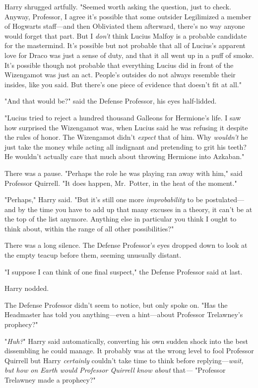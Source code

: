 Harry shrugged artfully. "Seemed worth asking the question, just to check. Anyway, Professor, I agree it's possible that some outsider Legilimized a member of Hogwarts staff---and then Obliviated them afterward, there's no way anyone would forget that part. But I \emph{don't} think Lucius Malfoy is a probable candidate for the mastermind. It's possible but not probable that all of Lucius's apparent love for Draco was just a sense of duty, and that it all went up in a puff of smoke. It's possible though not probable that everything Lucius did in front of the Wizengamot was just an act. People's outsides do not always resemble their insides, like you said. But there's one piece of evidence that doesn't fit at all."

"And that would be?" said the Defense Professor, his eyes half-lidded.

"Lucius tried to reject a hundred thousand Galleons for Hermione's life. I saw how surprised the Wizengamot was, when Lucius said he was refusing it despite the rules of honor. The Wizengamot didn't \emph{expect} that of him. Why \emph{wouldn't} he just take the money while acting all indignant and pretending to grit his teeth? He wouldn't actually care that much about throwing Hermione into Azkaban."

There was a pause. "Perhaps the role he was playing ran away with him," said Professor Quirrell. "It does happen, Mr.~Potter, in the heat of the moment."

"Perhaps," Harry said. "But it's still one more \emph{improbability} to be postulated---and by the time you have to add up that many excuses in a theory, it can't be at the top of the list anymore. Anything else in particular you think I ought to think about, within the range of all other possibilities?"

There was a long silence. The Defense Professor's eyes dropped down to look at the empty teacup before them, seeming unusually distant.

"I suppose I can think of one final suspect," the Defense Professor said at last.

Harry nodded.

The Defense Professor didn't seem to notice, but only spoke on. "Has the Headmaster has told you anything---even a hint---about Professor Trelawney's prophecy?"

"\emph{Huh?}" Harry said automatically, converting his own sudden shock into the best dissembling he could manage. It probably was at the wrong level to fool Professor Quirrell but Harry \emph{certainly} couldn't take time to think before replying---\emph{wait, but how on Earth would Professor Quirrell know about} that\emph{---} "Professor Trelawney made a prophecy?"

